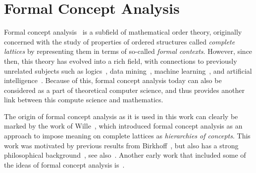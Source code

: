 \section{Formal Concept Analysis}
\label{sec:learn-impl-using}

Formal concept analysis~\cite{fca-book} is a subfield of mathematical order theory,
originally concerned with the study of properties of ordered structures called
\emph{complete lattices} by representing them in terms of so-called \emph{formal
  contexts}.  However, since then, this theory has evolved into a rich field, with
connections to previously unrelated subjects such as
logics~\cite{books/math/Prediger00,conf/iccs/FerreR00}, data
mining~\cite{arules:Zaki:1998}, machine learning~\cite{conf/icfca/Kuznetsov04}, and
artificial intelligence~\cite{rudolph2006relational,Diss-Felix}.  Because of this, formal
concept analysis today can also be considered as a part of theoretical computer science,
and thus provides another link between this compute science and mathematics.

The origin of formal concept analysis as it is used in this work can clearly be marked by
the work of Wille~\cite{fca:Wille:1982}, which introduced formal concept analysis as an
approach to impose meaning on complete lattices as \emph{hierarchies of concepts}.  This
work was motivated by previous results from Birkhoff~\cite{books/math/Birkhoff67}, but
also has a strong philosophical background~\cite{books/phil/Hentig72}, see
also~\cite{Wille:Begriffsdenken}.  Another early work that included some of the ideas of
formal concept analysis is~\cite{OrdreEtClassification}.


